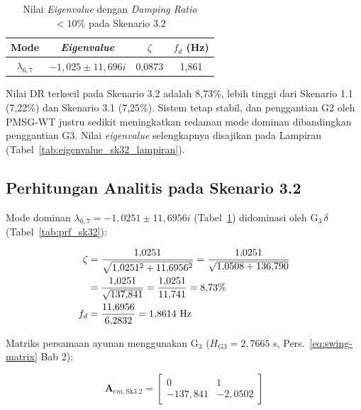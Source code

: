 \begin{table}[h]
	\caption{Nilai \textit{Eigenvalue} dengan \textit{Damping Ratio} $<10\%$
	pada Skenario 3.2}
	\vspace{0.5em}
	\centering
	\fontsize{12}{14.4}\selectfont
	\setlength{\tabcolsep}{6pt}
	\begin{tabular}{c c c c}
		\toprule
		\textbf{Mode} & \textbf{\textit{Eigenvalue}} & \textbf{$\zeta$} &
		\textbf{$f_d$ (Hz)} \\
		\midrule
		$\lambda_{6,7}$ & $-1{,}025 \pm 11{,}696i$ & 0,0873 & 1,861 \\
		\bottomrule
	\end{tabular}
	\label{tab:eigenvalue_sk32}
\end{table}

Nilai DR terkecil pada Skenario 3.2 adalah 8,73\%, lebih tinggi dari Skenario
1.1 (7,22\%) dan Skenario 3.1 (7,25\%). Sistem tetap stabil, dan penggantian G2
oleh PMSG-WT justru sedikit meningkatkan redaman mode dominan dibandingkan
penggantian G3. Nilai \textit{eigenvalue} selengkapnya disajikan pada Lampiran (Tabel~\ref{tab:eigenvalue_sk32_lampiran}).

\subsection{Perhitungan Analitis pada Skenario 3.2}

Mode dominan $\lambda_{6,7} = -1{,}0251 \pm 11{,}6956i$
(Tabel~\ref{tab:eigenvalue_sk32}) didominasi oleh G$_3\,\delta$
(Tabel~\ref{tab:prf_sk32}):

\begin{align}
    \zeta &= \frac{1{,}0251}{\sqrt{1{,}0251^2 + 11{,}6956^2}}
           = \frac{1{,}0251}{\sqrt{1{,}0508 + 136{,}790}} \notag \\
          &= \frac{1{,}0251}{\sqrt{137{,}841}}
           = \frac{1{,}0251}{11{,}741} = 8{,}73\% \\
    f_d   &= \frac{11{,}6956}{6{,}2832} = 1{,}8614 \text{ Hz}
\end{align}

Matriks persamaan ayunan menggunakan G$_3$ ($H_{\text{G3}} = 2{,}7665$ s,
Pers.~\ref{eq:swing-matrix} Bab 2):

\begin{equation}
    \mathbf{A}_{em,\text{Sk3.2}} =
    \begin{bmatrix}
        0 & 1 \\[4pt]
        -137{,}841 & -2{,}0502
    \end{bmatrix}
    \label{eq:Aem_sk32}
\end{equation}

